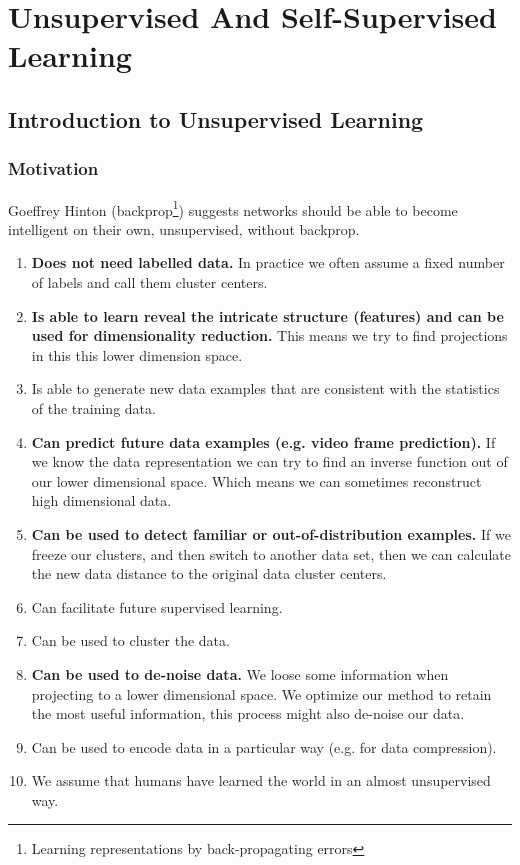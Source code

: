\documentclass[main]{subfiles}
\begin{document}
\newpage
\section{Unsupervised And Self-Supervised Learning}


\subsection{Introduction to Unsupervised Learning}
\subsubsection{Motivation}

Goeffrey Hinton (backprop\footnote{Learning representations by back-propagating errors}) suggests networks should be able to become intelligent on their own, unsupervised, without backprop.

\begin{enumerate}
    \item \textbf{Does not need labelled data.} In practice we often assume a fixed number of labels and call them cluster centers.
    \item \textbf {Is able to learn reveal the intricate structure (features) and can be used for dimensionality reduction.} This means we try to find projections in this this lower dimension space.
    \item Is able to generate new data examples that are consistent with the statistics of the training data.
    \item \textbf {Can predict future data examples (e.g. video frame prediction).} If we know the data representation we can try to find an inverse function out of our lower dimensional space. Which means we can sometimes reconstruct high dimensional data.
    \item \textbf {Can be used to detect familiar or out-of-distribution examples.} If we freeze our clusters, and then switch to another data set, then we can calculate the new data distance to the original data cluster centers.
    \item Can facilitate future supervised learning.
    \item Can be used to cluster the data.
    \item \textbf{Can be used to de-noise data.} We loose some information when projecting to a lower dimensional space. We optimize our method to retain the most useful information, this process might also de-noise our data.
    \item Can be used to encode data in a particular way (e.g. for data compression).
    \item We assume that humans have learned the world in an almost unsupervised way. 
\end{enumerate}
\end{document}
